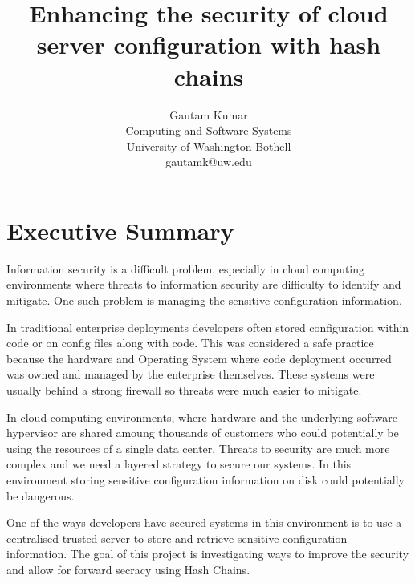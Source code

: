 \documentclass[10pt,conference]{IEEEtran}
\begin{document}
\title{Enhancing the security of cloud server configuration with hash chains}


\author{
{\rm Gautam Kumar}\\
Computing and Software Systems\\
University of Washington Bothell\\
gautamk@uw.edu
} %

\maketitle
\thispagestyle{empty}


\section{Executive Summary}
Information security is a difficult problem, especially in cloud computing environments where 
threats to information security are difficulty to identify and mitigate. One such problem is 
managing the sensitive configuration information.

In traditional enterprise deployments developers often stored configuration within code or on config 
files along with code. This was considered a safe practice because the hardware and Operating System 
where code deployment occurred was owned and managed by the enterprise themselves. These systems 
were usually behind a strong firewall so threats were much easier to mitigate. 

In cloud computing environments, where hardware and the underlying software hypervisor are shared 
amoung thousands of customers who could potentially be using the resources of a single data center, 
Threats to security are much more complex and we need a layered strategy to secure our systems. In 
this environment storing sensitive configuration information on disk could potentially be dangerous.



One of the ways developers have secured systems in this environment is to use a centralised trusted 
server to store and retrieve sensitive configuration information. The goal of this project is 
investigating ways to improve the security and allow for forward secracy using Hash 
Chains\cite{tian_self-healing_2008}.
\end{document}

